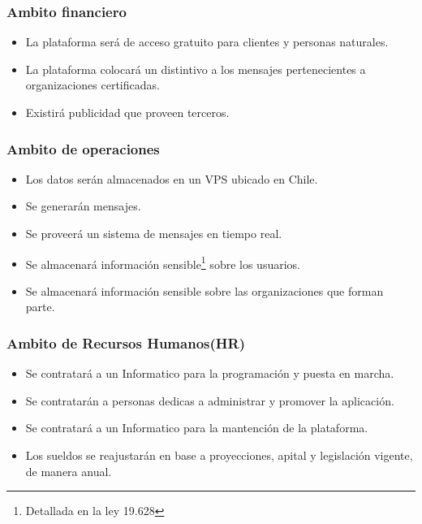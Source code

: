 \documentclass[letterpaper,openright,10pt,twoside]{report}
\begin{document}
					\subsubsection{Ambito financiero}
						\begin{itemize}
							\item La plataforma será de acceso gratuito para clientes y personas naturales.
							\item La plataforma colocará un distintivo a los mensajes pertenecientes a organizaciones certificadas.
							\item Existirá publicidad que proveen terceros.
						\end{itemize}
					\subsubsection{Ambito de operaciones}
						\begin{itemize}
							\item Los datos serán almacenados en un VPS ubicado en Chile.
							\item Se generarán mensajes.
							\item Se proveerá un sistema de mensajes en tiempo real.
							\item Se almacenará información sensible\footnote{Detallada en la ley 19.628} sobre los usuarios.
							\item Se almacenará información sensible sobre las organizaciones que forman parte. 
						\end{itemize}
					\subsubsection{Ambito de Recursos Humanos(HR)}
						\begin{itemize}
							\item Se contratará a un Informatico para la programación y puesta en marcha.
							\item Se contratarán a personas dedicas a administrar y promover la aplicación.
							\item Se contratará a un Informatico para la mantención de la plataforma.
							\item Los sueldos se reajustarán en base a proyecciones, apital y legislación vigente, de manera anual.
						\end{itemize}
\end{document}
